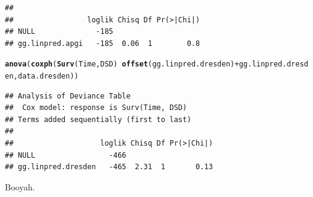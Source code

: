 \documentclass{article}\usepackage[]{graphicx}\usepackage[]{color}
\makeatletter
\newcommand{\hlopt}[1]{\textcolor[rgb]{0,0,0}{#1}}%
\newcommand{\hlstd}[1]{\textcolor[rgb]{0.345,0.345,0.345}{#1}}%
\newcommand{\hlkwd}[1]{\textcolor[rgb]{0.737,0.353,0.396}{\textbf{#1}}}%
\newenvironment{kframe}{%
 \def\at@end@of@kframe{}%
 \ifinner\ifhmode%
  \def\at@end@of@kframe{\end{minipage}}%
  \begin{minipage}{\columnwidth}%
 \fi\fi%
 \def\FrameCommand##1{\hskip\@totalleftmargin \hskip-\fboxsep
 \colorbox{shadecolor}{##1}\hskip-\fboxsep
     \hskip-\linewidth \hskip-\@totalleftmargin \hskip\columnwidth}%
 \MakeFramed {\advance\hsize-\width
   \@totalleftmargin\z@ \linewidth\hsize
   \@setminipage}}%
 {\par\unskip\endMakeFramed%
 \at@end@of@kframe}
\newenvironment{knitrout}{}{} %
\makeatother
\begin{document}
\begin{knitrout}
\begin{kframe}
\begin{verbatim}
## 
##                 loglik Chisq Df Pr(>|Chi|)
## NULL              -185                    
## gg.linpred.apgi   -185  0.06  1        0.8
\end{verbatim}
\begin{alltt}
\hlkwd{anova}\hlstd{(}\hlkwd{coxph}\hlstd{(}\hlkwd{Surv}\hlstd{(Time, DSD)} \hlopt{~} \hlkwd{offset}\hlstd{(gg.linpred.dresden)} \hlopt{+} \hlstd{gg.linpred.dresden, data.dresden))}
\end{alltt}
\begin{verbatim}
## Analysis of Deviance Table
##  Cox model: response is Surv(Time, DSD)
## Terms added sequentially (first to last)
## 
##                    loglik Chisq Df Pr(>|Chi|)
## NULL                 -466                    
## gg.linpred.dresden   -465  2.31  1       0.13
\end{verbatim}
\end{kframe}
\end{knitrout}
Booyah.
\end{document}
